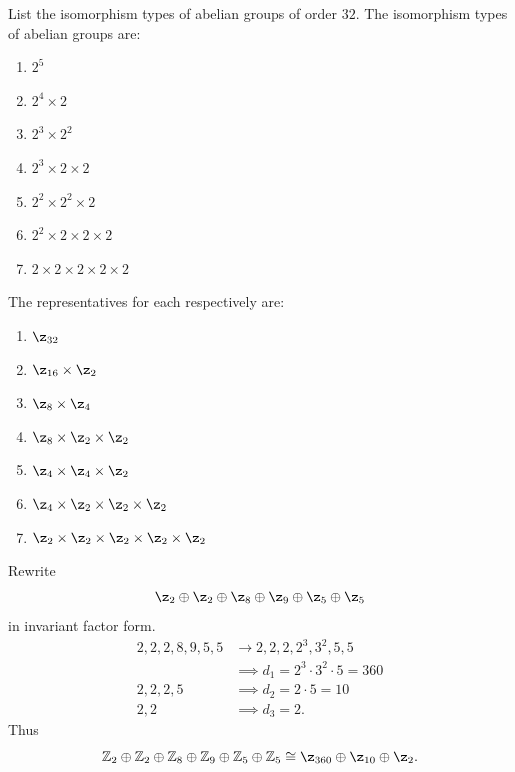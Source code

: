 \begin{problem}[Exercise 3]{
    List the isomorphism types of abelian groups of order $32$.
}
    The isomorphism types of abelian groups are:
    \begin{enumerate}
        \item $2^5$
        \item $2^4 \times 2$
        \item $2^3 \times 2^2$
        \item $2^3 \times 2 \times 2$
        \item $2^2 \times 2^2 \times 2$
        \item $2^2 \times 2 \times 2 \times 2$
        \item $2 \times 2 \times 2 \times 2 \times 2$
    \end{enumerate}
    The representatives for each respectively are:
    \begin{enumerate}
        \item $\z_{32}$
        \item $\z_{16} \times \z_{2}$
        \item $\z_{8} \times \z_{4}$
        \item $\z_{8} \times \z_{2} \times \z_{2}$
        \item $\z_{4} \times \z_{4} \times \z_{2}$
        \item $\z_{4} \times \z_{2} \times \z_{2} \times \z_{2}$
        \item $\z_{2} \times \z_{2} \times \z_{2} \times \z_{2} \times \z_{2}$
    \end{enumerate}
\end{problem}

\begin{problem}[Exercise 4]{
    Rewrite
    \[
        \z_{2} \oplus \z_{2} \oplus \z_{8} \oplus \z_{9} \oplus \z_{5} \oplus \z_{5}
    \]
    in invariant factor form.
}
    \begin{align*}
        2,2,2,8,9,5,5 &\rightarrow 2,2,2,2^3,3^2,5,5\\
        &\implies d_1 = 2^3 \cdot 3^2 \cdot 5 = 360\\
        2,2,2,5 &\implies d_2 = 2 \cdot 5 = 10\\
        2,2 &\implies d_3 = 2.
    \end{align*}
    Thus
    \[
        \mathbb{Z}_2 \oplus \mathbb{Z}_2 \oplus \mathbb{Z}_8 \oplus \mathbb{Z}_9 \oplus \mathbb{Z}_5 \oplus \mathbb{Z}_5 \cong \z_{360} \oplus \z_{10} \oplus \z_{2}.
    \]
\end{problem}

